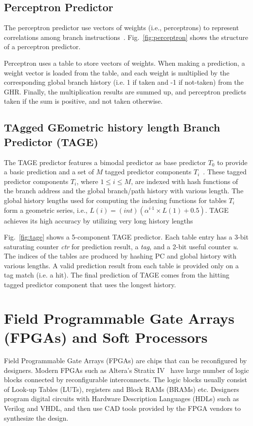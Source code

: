 \subsection{Perceptron Predictor}
\label{sec:background:dirpred:perceptron}
The perceptron predictor use vectors of weights (i.e., perceptrons) to represent correlations among branch instructions~\cite{perceptron}. Fig.~\ref{fig:perceptron} shows the structure of a perceptron predictor.

Perceptron uses a table to store vectors of weights. When making a prediction, a weight vector is loaded from the table, and each weight is multiplied by the corresponding global branch history (i.e. 1 if taken and -1 if not-taken) from the GHR. Finally, the multiplication results are summed up, and perceptron predicts taken if the sum is positive, and not taken otherwise.


\subsection{TAgged GEometric history length Branch Predictor (TAGE)}
\label{sec:background:dirpred:tage}
The TAGE predictor features a bimodal predictor as base predictor $T_0$ to provide a basic prediction and a set of $M$ tagged predictor components $T_i$~\cite{tage}. These tagged predictor components $T_i$, where $1\leq i\leq M$, are indexed with hash functions of the branch address and the global branch/path history with various length. The global history lengths used for computing the indexing functions for tables $T_i$ form a geometric series, i.e., $L(i) = (int)(\alpha^{i{}^{\_}1}\times L(1)+0.5)$. TAGE achieves its high accuracy by utilizing very long history lengths

Fig.~\ref{fig:tage} shows a 5-component TAGE predictor. Each table entry has a 3-bit saturating counter \textit{ctr} for prediction result, a \textit{tag}, and a 2-bit useful counter \textit{u}. The indices of the tables are produced by hashing PC and global history with various lengths. A valid prediction result from each table is provided only on a tag match (i.e. a hit). The final prediction of TAGE comes from the hitting tagged predictor component that uses the longest history.


\section{Field Programmable Gate Arrays (FPGAs) and Soft Processors}
\label{sec:background:fpga}
Field Programmable Gate Arrays (FPGAs) are chips that can be reconfigured by designers. Modern FPGAs such as Altera's Stratix IV~\cite{StratixIV} have large number of logic blocks connected by reconfigurable interconnects. The logic blocks usually consist of Look-up Tables (LUTs), registers and Block RAMs (BRAMs) etc. Designers program digital circuits with Hardware Description Languages (HDLs) such as Verilog and VHDL, and then use CAD tools provided by the FPGA vendors to synthesize the design.

